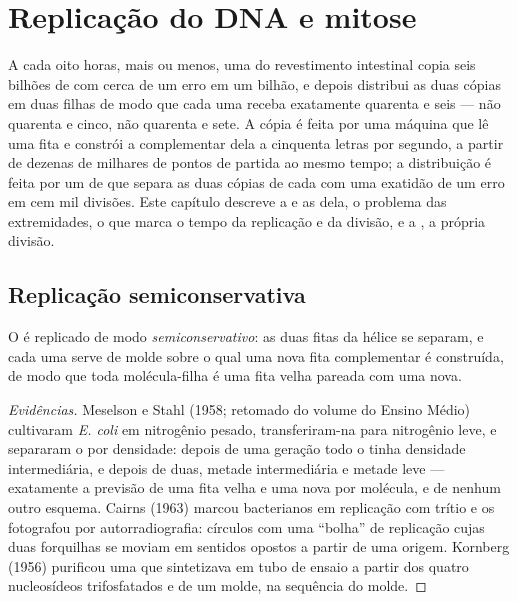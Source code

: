 \chapter{Replicação do DNA e mitose}\label{ch:b1:replication-mitosis}

A cada oito horas, mais ou menos, uma  do revestimento intestinal
copia seis bilhões de  com cerca de um erro em um bilhão,
e depois distribui as duas cópias em duas filhas de modo que cada uma
receba exatamente quarenta e seis  --- não quarenta e cinco,
não quarenta e sete. A cópia é feita por uma máquina que lê uma fita e
constrói a complementar dela a cinquenta letras por segundo, a partir de
dezenas de milhares de pontos de partida ao mesmo tempo; a distribuição
é feita por um  de  que separa as duas cópias de cada
 com uma exatidão de um erro em cem mil divisões. Este
capítulo descreve a  e as  dela, o
problema das extremidades, o  que marca o tempo da
replicação e da divisão, e a , a própria divisão.

\section{Replicação semiconservativa}

\begin{proposition}\label{prop:b1:replication-mitosis:semiconservative}
O  é replicado de modo \emph{semiconservativo}: as duas fitas da
hélice se separam, e cada uma serve de molde sobre o qual uma nova fita
complementar é construída, de modo que toda molécula-filha é uma fita
velha pareada com uma nova.
\end{proposition}
\begin{proof}[Evidências]
Meselson e Stahl (1958; retomado do volume do Ensino Médio) cultivaram
\emph{E. coli} em nitrogênio pesado, transferiram-na para nitrogênio
leve, e separaram o  por densidade: depois de uma geração todo o 
tinha densidade intermediária, e depois de duas, metade intermediária e
metade leve --- exatamente a previsão de uma fita velha e uma nova por
molécula, e de nenhum outro esquema. Cairns (1963) marcou 
bacterianos em replicação com trítio e os fotografou por
autorradiografia: círculos com uma ``bolha'' de replicação cujas duas
forquilhas se moviam em sentidos opostos a partir de uma origem.
Kornberg (1956) purificou uma  que sintetizava  em tubo de
ensaio a partir dos quatro nucleosídeos trifosfatados e de um molde, na
sequência do molde.
\end{proof}

